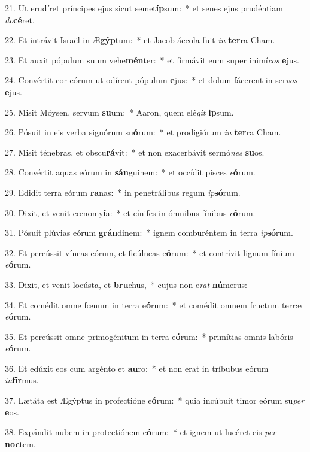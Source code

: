 21. Ut erudíret príncipes ejus sicut semet\textbf{íp}sum:~*  et senes ejus prudéntiam \textit{do}\textbf{cé}ret.\

22. Et intrávit Israël in Æ\textbf{gýp}tum:~*  et Jacob áccola fuit \textit{in} \textbf{ter}ra Cham.\

23. Et auxit pópulum suum vehe\textbf{mén}ter:~*  et firmávit eum super inimí\textit{cos} \textbf{e}jus.\

24. Convértit cor eórum ut odírent pópulum \textbf{e}jus:~*  et dolum fácerent in ser\textit{vos} \textbf{e}jus.\

25. Misit Móysen, servum \textbf{su}um:~*  Aaron, quem elé\textit{git} \textbf{ip}sum.\

26. Pósuit in eis verba signórum su\textbf{ó}rum:~*  et prodigiórum \textit{in} \textbf{ter}ra Cham.\

27. Misit ténebras, et obscu\textbf{rá}vit:~*  et non exacerbávit sermó\textit{nes} \textbf{su}os.\

28. Convértit aquas eórum in \textbf{sán}guinem:~*  et occídit pisces \textit{e}\textbf{ó}rum.\

29. Edidit terra eórum \textbf{ra}nas:~*  in penetrálibus regum \textit{ip}\textbf{só}rum.\

30. Dixit, et venit cœnomy\textbf{í}a:~*  et cínifes in ómnibus fínibus \textit{e}\textbf{ó}rum.\

31. Pósuit plúvias eórum \textbf{grán}dinem:~*  ignem comburéntem in terra \textit{ip}\textbf{só}rum.\

32. Et percússit víneas eórum, et ficúlneas e\textbf{ó}rum:~*  et contrívit lignum fínium \textit{e}\textbf{ó}rum.\

33. Dixit, et venit locústa, et \textbf{bru}chus,~*  cujus non e\textit{rat} \textbf{nú}merus:\

34. Et comédit omne fœnum in terra e\textbf{ó}rum:~*  et comédit omnem fructum terræ \textit{e}\textbf{ó}rum.\

35. Et percússit omne primogénitum in terra e\textbf{ó}rum:~*  primítias omnis labóris \textit{e}\textbf{ó}rum.\

36. Et edúxit eos cum argénto et \textbf{au}ro:~*  et non erat in tríbubus eórum \textit{in}\textbf{fír}mus.\

37. Lætáta est Ægýptus in profectióne e\textbf{ó}rum:~*  quia incúbuit timor eórum su\textit{per} \textbf{e}os.\

38. Expándit nubem in protectiónem e\textbf{ó}rum:~*  et ignem ut lucéret eis \textit{per} \textbf{noc}tem.\

